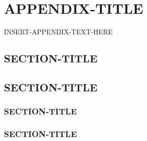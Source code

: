 \chapter{APPENDIX-TITLE}
\thispagestyle{plain}

\label{APPENDIX-LABEL}

INSERT-APPENDIX-TEXT-HERE

\section{SECTION-TITLE}
\label{SECTION-LABEL}

\section{SECTION-TITLE}
\label{SECTION-LABEL}

\subsection{SECTION-TITLE}
\label{SECTION-LABEL}

\subsection{SECTION-TITLE}
\label{SECTION-LABEL}